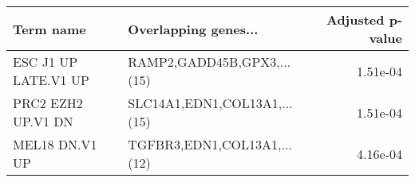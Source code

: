 \begin{tabular}{llr}
\toprule
           Term name &         Overlapping genes... &  Adjusted p-value \\
\midrule
ESC J1 UP LATE.V1 UP &   RAMP2,GADD45B,GPX3,...(15) &          1.51e-04 \\
  PRC2 EZH2 UP.V1 DN & SLC14A1,EDN1,COL13A1,...(15) &          1.51e-04 \\
      MEL18 DN.V1 UP &  TGFBR3,EDN1,COL13A1,...(12) &          4.16e-04 \\
\bottomrule
\end{tabular}
